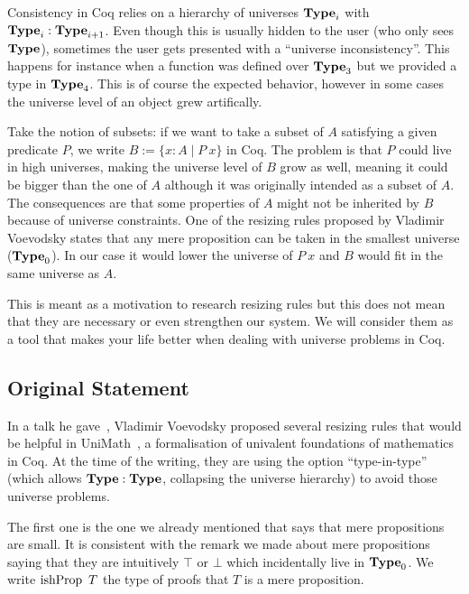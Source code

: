 \documentclass[11pt]{article}
\theoremstyle{plain}
\theoremstyle{remark}
\begin{document}
Consistency in Coq relies on a hierarchy of universes $\operatorname{\mathbf{Type}}_i$ with
$\operatorname{\mathbf{Type}}_i : \operatorname{\mathbf{Type}}_{i+1}$. Even though this is usually hidden to the user
(who only sees $\operatorname{\mathbf{Type}}$), sometimes the user gets presented with a
``universe inconsistency''. This happens for instance when a function was
defined over $\operatorname{\mathbf{Type}}_3$ but we provided a type in $\operatorname{\mathbf{Type}}_4$.
This is of course the expected behavior, however in some cases the universe
level of an object grew artifically.

Take the notion of subsets: if we want to take a subset of $A$ satisfying
a given predicate $P$, we write $B := \{ x : A \mid P\ x \}$ in Coq.
The problem is that $P$ could live in high universes, making the universe level
of $B$ grow as well, meaning it could be bigger than the one of $A$ although
it was originally intended as a subset of $A$.
The consequences are that some properties of $A$ might not be inherited by
$B$ because of universe constraints.
One of the resizing rules proposed by Vladimir Voevodsky states that any
mere proposition can be taken in the smallest universe ($\operatorname{\mathbf{Type}}_0$).
In our case it would lower the universe of $P\ x$ and $B$ would fit in the same
universe as $A$.

This is meant as a motivation to research resizing rules but this does not mean
that they are necessary or even strengthen our system.
We will consider them as a tool that makes your life better when dealing with
universe problems in Coq.

\subsection{Original Statement}

In a talk he gave~\cite{vv:resizing}, Vladimir Voevodsky proposed several
resizing rules that would be helpful in UniMath~\cite{UniMath}, a formalisation
of univalent foundations of mathematics in Coq. At the time of the writing, they
are using the option ``type-in-type'' (which allows $\operatorname{\mathbf{Type}} : \operatorname{\mathbf{Type}}$, collapsing
the universe hierarchy) to avoid those universe problems.

The first one is the one we already mentioned that says that mere propositions
are small. It is consistent with the remark we made about mere propositions
saying that they are intuitively $\top$ or $\bot$ which incidentally live in
$\operatorname{\mathbf{Type}}_0$. We write $\operatorname{ishProp}\ T$ the type of proofs that $T$ is a mere
proposition.

\begin{mathc}
\end{mathc}
\end{document}
